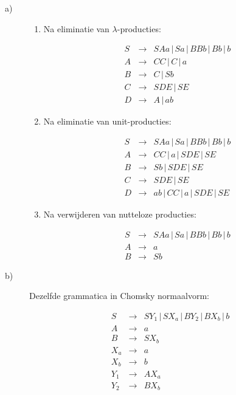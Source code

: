 \documentclass[a4paper,11pt]{article}
\begin{document}
\begin{description}


\item[a)]

\begin{enumerate}

\item

Na eliminatie van $\lambda$-producties:

\begin{eqnarray*}
S & \rightarrow & SAa \, | \, Sa \, | \, BBb \, | \, Bb \, | \, b \\
A & \rightarrow & CC \, | \, C \, | \, a \\
B & \rightarrow & C \, | \, Sb \\
C & \rightarrow & SDE \, | \, SE \\
D & \rightarrow & A \, | \, ab
\end{eqnarray*}

\item

Na eliminatie van unit-producties:

\begin{eqnarray*}
S & \rightarrow & SAa \, | \, Sa \, | \, BBb \, | \, Bb \, | \, b \\
A & \rightarrow & CC \, | \, a \, | \, SDE \, | \, SE \\
B & \rightarrow & Sb \, | \, SDE \, | \, SE \\
C & \rightarrow & SDE \, | \, SE \\
D & \rightarrow & ab \, | \, CC \, | \, a \, | \, SDE \, | \, SE
\end{eqnarray*}

\item

Na verwijderen van nutteloze producties:

\begin{eqnarray*}
S & \rightarrow & SAa \, | \, Sa \, | \, BBb \, | \, Bb \, | \, b \\
A & \rightarrow & a \\
B & \rightarrow & Sb
\end{eqnarray*}

\end{enumerate}


\item[b)]

Dezelfde grammatica in Chomsky normaalvorm:

\begin{eqnarray*}
S & \rightarrow & SY_{1} \, | \, SX_{a} \, | \, BY_{2} \, | \, BX_{b} \, | \, b \\
A & \rightarrow & a \\
B & \rightarrow & SX_{b} \\
X_{a} & \rightarrow & a \\
X_{b} & \rightarrow & b \\
Y_{1} & \rightarrow & AX_{a} \\
Y_{2} & \rightarrow & BX_{b}
\end{eqnarray*}



\end{description}
\end{document}

